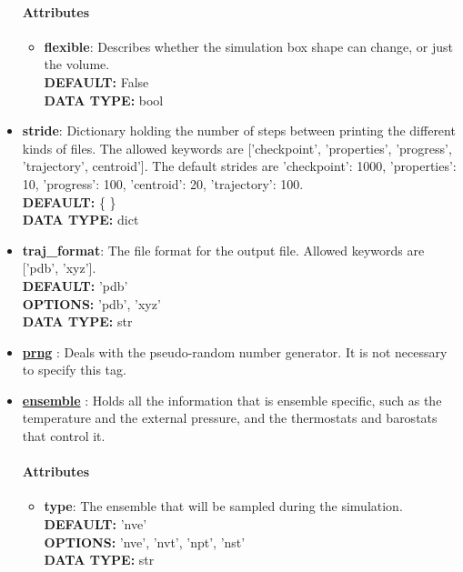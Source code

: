 \begin{itemize}
\paragraph{Attributes}
 \begin{itemize}
\item {\bf flexible}:
 Describes whether the simulation box shape can change, or just the volume.
{\\ \bf DEFAULT: }False
{\\ \bf DATA TYPE: }bool
\end{itemize}
 
\item {\bf stride}:
 Dictionary holding the number of steps between printing the different kinds of files. The allowed keywords are ['checkpoint', 'properties', 'progress', 'trajectory', centroid']. The default strides are {'checkpoint': 1000, 'properties': 10, 'progress': 100, 'centroid': 20, 'trajectory': 100}.
{\\ \bf DEFAULT: }\{ \}
{\\ \bf DATA TYPE: }dict
\item {\bf traj\_format}:
 The file format for the output file. Allowed keywords are ['pdb', 'xyz'].
{\\ \bf DEFAULT: }'pdb'
{\\ \bf OPTIONS: }'pdb', 'xyz'
{\\ \bf DATA TYPE: }str
\item {\bf \hyperref[RANDOM]{prng} }:
 Deals with the pseudo-random number generator. It is not necessary to specify this tag.
\item {\bf \hyperref[ENSEMBLE]{ensemble} }:
 Holds all the information that is ensemble specific, such as the temperature and the external pressure, and the thermostats and barostats that control it.
\paragraph{Attributes}
 \begin{itemize}
\item {\bf type}:
 The ensemble that will be sampled during the simulation.
{\\ \bf DEFAULT: }'nve'
{\\ \bf OPTIONS: }'nve', 'nvt', 'npt', 'nst'
{\\ \bf DATA TYPE: }str
\end{itemize}
 
\end{itemize}
 
